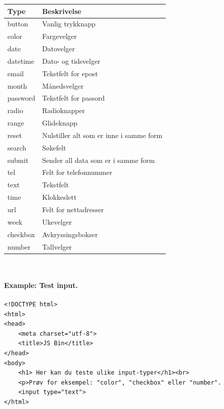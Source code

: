 \documentclass[%
oneside,                 %
final,                   %
12pt]{article}
\newenvironment{notice_mdfboxadmon}[1][]{
\begin{notice_mdfboxmdframed}[frametitle=#1]
}
{
\end{notice_mdfboxmdframed}
}
\begin{document}
\providecommand{\specialcell}[2][c]{\begin{tabular}[c]{@{}#1@{}}#2\end{tabular}}
{\footnotesize\renewcommand{\arraystretch}{1.2}
\vspace{2em}
\begin{tabular}{|l|l|}
\hline
\textbf{Type} & \textbf{Beskrivelse}\\
\hline
button & Vanlig trykknapp\\
\hline
color & Fargevelger\\
\hline
date & Datovelger\\
\hline
datetime & Dato- og tidsvelger\\
\hline
email & Tekstfelt for epost\\
\hline
month & Månedsvelger\\
\hline
password & Tekstfelt for passord\\
\hline
radio & Radioknapper\\
\hline
range & Glideknapp\\
\hline
reset & Nulstiller alt som er inne i samme form\\
\hline
search & Søkefelt\\
\hline
submit & Sender all data som er i samme form\\
\hline
tel & Felt for telefonnummer\\
\hline
text & Tekstfelt\\
\hline
time & Klokkeslett\\
\hline
url & Felt for nettadresser\\
\hline
week & Ukevelger\\
\hline
checkbox & Avkryssingsbokser\\
\hline
number & Tallvelger\\
\hline
\end{tabular}
}\renewcommand{\arraystretch}{1.0}
\\


\paragraph{Example: Test input.}
\label{example:testinput}


\begin{notice_mdfboxadmon}
\begin{verbatim}
<!DOCTYPE html>
<html>
<head>
    <meta charset="utf-8">
    <title>JS Bin</title>
</head>
<body>
    <h1> Her kan du teste ulike input-typer</h1><br>
    <p>Prøv for eksempel: "color", "checkbox" eller "number".
    <input type="text">
</html>
\end{verbatim}
\end{notice_mdfboxadmon}
\end{document}
